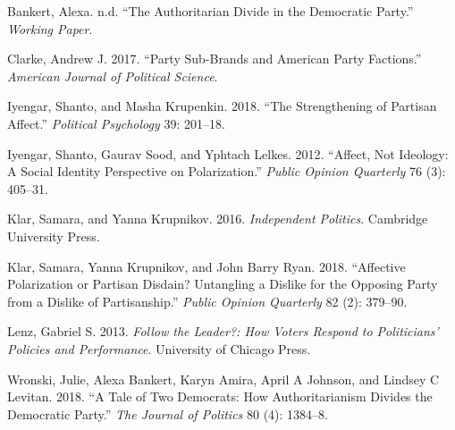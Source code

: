 \documentclass[
  12,
]{paper}
\newlength{\cslhangindent}
\newenvironment{cslreferences}%
  {\setlength{\parindent}{0pt}%
  \everypar{\setlength{\hangindent}{\cslhangindent}}\ignorespaces}%
  {\par}
\begin{document}
\hypertarget{refs}{}
\begin{cslreferences}
\leavevmode\hypertarget{ref-bankert2020authoritarian}{}%
Bankert, Alexa. n.d. ``The Authoritarian Divide in the Democratic
Party.'' \emph{Working Paper}.

\leavevmode\hypertarget{ref-clarke2017party}{}%
Clarke, Andrew J. 2017. ``Party Sub-Brands and American Party
Factions.'' \emph{American Journal of Political Science}.

\leavevmode\hypertarget{ref-iyengar2018strengthening}{}%
Iyengar, Shanto, and Masha Krupenkin. 2018. ``The Strengthening of
Partisan Affect.'' \emph{Political Psychology} 39: 201--18.

\leavevmode\hypertarget{ref-iyengar2012affect}{}%
Iyengar, Shanto, Gaurav Sood, and Yphtach Lelkes. 2012. ``Affect, Not
Ideology: A Social Identity Perspective on Polarization.'' \emph{Public
Opinion Quarterly} 76 (3): 405--31.

\leavevmode\hypertarget{ref-klar2016independent}{}%
Klar, Samara, and Yanna Krupnikov. 2016. \emph{Independent Politics}.
Cambridge University Press.

\leavevmode\hypertarget{ref-klar2018affective}{}%
Klar, Samara, Yanna Krupnikov, and John Barry Ryan. 2018. ``Affective
Polarization or Partisan Disdain? Untangling a Dislike for the Opposing
Party from a Dislike of Partisanship.'' \emph{Public Opinion Quarterly}
82 (2): 379--90.

\leavevmode\hypertarget{ref-lenz2013follow}{}%
Lenz, Gabriel S. 2013. \emph{Follow the Leader?: How Voters Respond to
Politicians' Policies and Performance}. University of Chicago Press.

\leavevmode\hypertarget{ref-wronski2018tale}{}%
Wronski, Julie, Alexa Bankert, Karyn Amira, April A Johnson, and Lindsey
C Levitan. 2018. ``A Tale of Two Democrats: How Authoritarianism Divides
the Democratic Party.'' \emph{The Journal of Politics} 80 (4): 1384--8.
\end{cslreferences}
\end{document}
